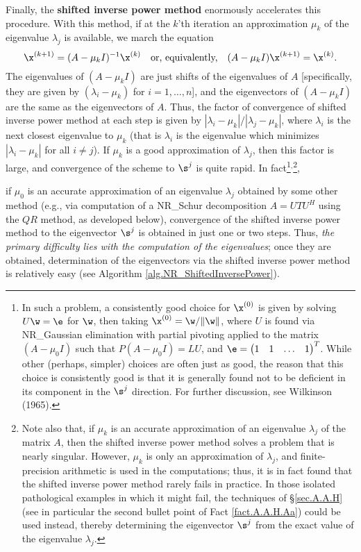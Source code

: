 Finally, the {\bf shifted inverse power method} enormously accelerates this procedure.
With this method, if at the $k$'th iteration an approximation $\mu_k$ of the eigenvalue $\lambda_{j}$ is available, we march the equation
\begin{equation}
\x^{(k+1)}=(A-\mu_k I)^{-1}\x^{(k)} \quad \textrm{or, equivalently,} \quad (A-\mu_k I)\x^{(k+1)}=\x^{(k)}.\label{eq.shiftedinversepowermethod}
\end{equation}
The eigenvalues of $(A-\mu_k I)$ are just shifts of the eigenvalues of $A$ [specifically, they are given by
$(\lambda_i-\mu_k)$ for $i=1,\ldots,n$], and the eigenvectors of $(A-\mu_k I)$ are the same as the eigenvectors of $A$.
Thus, the factor of convergence of shifted inverse power method at each step is given by $|\lambda_{i}-\mu_k|/|\lambda_{j}-\mu_k|$, where $\lambda_{i}$
is the next closest eigenvalue to $\mu_k$ (that is $\lambda_i$ is the eigenvalue which minimizes $|\lambda_{i}-\mu_k|$ for all $i\ne j$).
If $\mu_k$ is a good approximation of $\lambda_{j}$, then this factor is large, and convergence of the scheme to $\s^j$ is quite rapid.
In fact\footnote{In such a problem, a consistently good choice for $\x^{(0)}$ is given by solving $U\w=\e$ for $\w$, then taking $\x^{(0)}=\w/\Vert \w \Vert$, where
$U$ is found via NR_Gaussian elimination with partial pivoting applied to the matrix $(A-\mu_0 I)$
such that $P(A-\mu_0 I)=LU$, and
$\e=\begin{pmatrix} 1 & 1 & \ldots & 1\end{pmatrix}^T$. While other (perhaps, simpler) choices are often just as good,
the reason that this choice is consistently good is that
it is generally found not to be deficient in its component in the $\s^j$ direction.
For further discussion, see Wilkinson (1965).}${}^{,}$\footnote{Note also that, if $\mu_k$ is an accurate approximation of an eigenvalue $\lambda_j$
of the matrix $A$, then the shifted inverse power method solves a problem that is nearly singular.  However,
$\mu_k$ is only an approximation of $\lambda_j$, and finite-precision arithmetic is used in the computations;
thus, it is in fact found that the shifted inverse power method rarely fails in practice.
In those isolated pathological examples in which it might fail, the techniques of \S \ref{sec.A.A.H} (see in particular the second
bullet point of Fact \ref{fact.A.A.H.Aa}) could be used instead, thereby determining the eigenvector $\s^j$ from the exact value of the eigenvalue
$\lambda_j$.},
\beginmylistb
\item if $\mu_0$ is an accurate approximation of an eigenvalue $\lambda_{j}$ obtained by some other method (e.g., via computation of a NR_Schur
decomposition $A=UTU^H$ using the $QR$ method, as developed below), convergence of the shifted inverse power method
to the eigenvector $\s^j$ is obtained in just one or two steps.
\endmylist
Thus, {\it the primary difficulty lies with the computation of the eigenvalues}; once they are obtained, determination of the eigenvectors
via the shifted inverse power method is relatively easy (see Algorithm \ref{alg.NR_ShiftedInversePower}).

